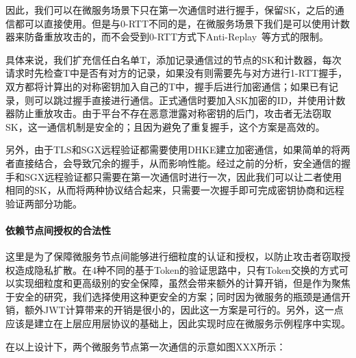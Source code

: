 因此，我们可以在微服务场景下只在第一次通信时进行握手，保留SK，之后的通信都可以直接使用。但是与0-RTT不同的是，在微服务场景下我们是可以使用计数器来防备重放攻击的，而不会受到0-RTT方式下Anti-Replay~\cite{8446}等方式的限制。

具体来说，我们扩充信任白名单T，添加记录通信过的节点的SK和计数器，每次请求时先检查T中是否有对方的记录，如果没有则需要先与对方进行1-RTT握手，双方都将计算出的对称密钥加入自己的T中，握手后进行加密通信；如果已有记录，则可以跳过握手直接进行通信。正式通信时要加入SK加密的ID，并使用计数器防止重放攻击。由于平台不存在恶意泄露对称密钥的后门，攻击者无法窃取SK，这一通信机制是安全的；且因为避免了重复握手，这个方案是高效的。

另外，由于TLS和SGX远程验证都需要使用DHKE建立加密通信，如果简单的将两者直接结合，会导致冗余的握手，从而影响性能。经过之前的分析，安全通信的握手和SGX远程验证都只需要在第一次通信时进行一次，因此我们可以让二者使用相同的SK，从而将两种协议结合起来，只需要一次握手即可完成密钥协商和远程验证两部分功能。

\paragraph{依赖节点间授权的合法性}
这里是为了保障微服务节点间能够进行细粒度的认证和授权，以防止攻击者窃取授权造成隐私扩散。在4种不同的基于Token的验证思路中，只有Token交换的方式可以实现细粒度和更高级别的安全保障，虽然会带来额外的计算开销，但是作为聚焦于安全的研究，我们选择使用这种更安全的方案；同时因为微服务的瓶颈是通信开销，额外JWT计算带来的开销是很小的，因此这一方案是可行的。另外，这一点应该是建立在上层应用层协议的基础上，因此实现时应在微服务示例程序中实现。

在以上设计下，两个微服务节点第一次通信的示意如图XXX所示：



